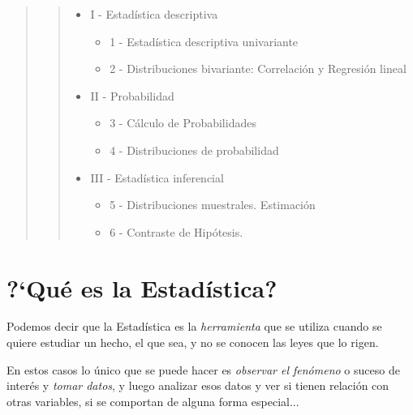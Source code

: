 \vspace{2 cm}

\begin{quotation} \begin{quotation}
\noindent 
\begin{large}
\begin{itemize}
\item I - Estadística descriptiva
	\begin{itemize}
	\item 1 - Estadística descriptiva univariante
	\item 2 - Distribuciones bivariante: Correlación y Regresión lineal
	\end{itemize}
\item II - Probabilidad
	\begin{itemize}	
	\item 3 - Cálculo de Probabilidades
	\item 4 - Distribuciones de probabilidad
	\end{itemize}
\item III - Estadística inferencial
	\begin{itemize}
	\item 5 - Distribuciones muestrales. Estimación
	\item 6 - Contraste de Hipótesis. 
	\end{itemize}
\end{itemize}
\end{large}
\end{quotation} \end{quotation}

\newpage %


\section{?`Qué es la Estadística?}


Podemos decir que la Estadística es la \emph{herramienta} que se utiliza cuando se quiere estudiar un hecho, el que sea, y no se conocen las leyes que lo rigen. 

En estos casos lo único que se puede hacer es \emph{observar el fenómeno} o suceso de interés y \emph{tomar datos}, y luego analizar esos datos y ver si tienen relación con otras variables, si se comportan de alguna forma especial... 

